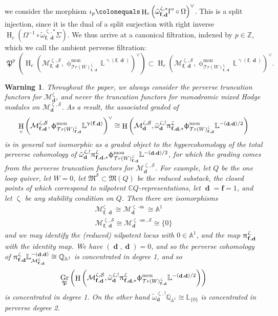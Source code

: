 \documentclass[a4paper,10pt]{amsart}
\renewcommand{\gamma}{\upgamma}
\renewcommand{\zeta}{\upzeta}
\renewcommand{\pi}{\uppi\hspace{0.05em}}
\renewcommand{\Gamma}{\Upgamma}
\renewcommand{\phi}{\upphi}
\newtheorem{warning}[theorem]{Warning}
\renewcommand{\AA}{\mathbb{A}}
\DeclareMathOperator{\Pf}{\mathfrak{P}}
\newcommand{\ff}{\mathbf{f}}
\newcommand{\LL}{\mathbb{L}}
\newcommand{\QQ}{\mathbb{Q}}
\newcommand{\SP}{\mathcal{S}}
\newcommand{\WW}{\mathcal{T}r(W)}
\newcommand{\Mst}{\mathfrak{M}}
\newcommand{\Msp}{\mathcal{M}}
\newcommand{\phim}[1]{\phi^{\mon}_{#1}}
\DeclareMathOperator{\sst}{-ss}
\DeclareMathOperator{\mon}{mon}
\DeclareMathOperator{\Gr}{Gr}
\DeclareMathOperator{\dd}{\mathbf{d}}
\DeclareMathOperator{\HO}{H}
\begin{document}
we consider the morphism $\iota_p\colonequals\HO_c\left(\tilde{\omega}_{\ff,\dd}^{\zeta,*}\Gamma'\circ \Omega\right)^{\vee}$.  This is a split injection, since it is the dual of a split surjection with right inverse $\HO_c(\Omega^{-1}\circ\tilde{\omega}_{\ff,\dd}^{\zeta,*}\Sigma)$.  We thus arrive at a canonical filtration, indexed by $p\in\mathbb{Z}$, which we call the ambient perverse filtration:
\[
\Pf^p\left(\HO_c\left(\Msp^{\zeta,\SP}_{\ff,\dd},\phim{\WW^{\zeta}_{\ff,\dd}}\LL^{\gamma(\ff,\dd)}\right)^{\vee}\right)\subset \HO_c\left(\Msp^{\zeta,\SP}_{\ff,\dd},\phim{\WW_{\ff,\dd}^{\zeta}}\LL^{\gamma(\ff,\dd)}\right)^{\vee}.
\]
\begin{warning}
\label{PervWarning}
Throughout the paper, we always consider the perverse truncation functors for $\Msp_{\dd}^{\zeta}$, and never the truncation functors for monodromic mixed Hodge modules on $\Msp_{\dd}^{\zeta,\SP}$.  As a result, the associated graded of 
\[
\HO_c\left(\Msp^{\zeta,\SP}_{\ff,\dd},\phim{\WW_{\ff,\dd}^{\zeta}}\LL^{\gamma(\ff,\dd)}\right)^{\vee}\cong \HO\left(\Msp^{\zeta,\SP}_{\dd},\tilde{\omega}^{\zeta,!}_{\dd}\pi_{\ff,\dd,*}^{\zeta}\phim{\WW^{\zeta}_{\ff,\dd}}\LL^{{}-(\dd,\dd)/2}\right)
\]
is in general \textit{not} isomorphic as a graded object to the hypercohomology of the total perverse cohomology of $\tilde{\omega}^{\zeta,!}_{\dd}\pi_{\ff,\dd,*}^{\zeta}\phim{\WW^{\zeta}_{\ff,\dd}}\LL^{{}-(\dd,\dd)/2}$, for which the grading comes from the perverse truncation functors for $\Msp_{\dd}^{\zeta,\SP}$.  For example, let $Q$ be the one loop quiver, let $W=0$, let $\Mst^{\SP}\subset \Mst(Q)$ be the reduced substack, the closed points of which correspond to nilpotent $\mathbb{C}Q$-representations, let $\dd=\ff=1$, and let $\zeta$ be any stability condition on $Q$.   Then there are isomorphisms
\begin{align*}
\Msp^{\zeta}_{\ff,\dd}\cong\Msp^{\zeta\sst}_{\dd}\cong\mathbb{A}^1\\
\Msp^{\zeta,\SP}_{\ff,\dd}\cong\Msp^{\zeta\sst,\SP}_{\dd}\cong \{0\}
\end{align*}
and we may identify the (reduced) nilpotent locus with $0\in\AA^1$, and the map $\pi^{\zeta}_{\ff,\dd}$ with the identity map.  We have $(\dd,\dd)=0$, and so the perverse cohomology of $\pi^{\zeta}_{\ff,\dd}\LL_{\Msp_{\ff,\dd}^{\zeta}}^{-(\dd,\dd)}\cong\QQ_{\AA^1}$ is concentrated in degree 1, and so
\[
\Gr_{\Pf}\left(\HO\left(\Msp^{\zeta,\SP}_{\ff,\dd},\tilde{\omega}^{\zeta,!}_{\dd}\pi_{\ff,\dd,*}^{\zeta}\phim{\WW^{\zeta}_{\ff,\dd}}\LL^{{}-(\dd,\dd)/2}\right)\right)
\]
is concentrated in degree 1.  On the other hand $\tilde{\omega}^{\zeta,!}_{\dd}\mathbb{Q}_{\AA^1}\cong \LL_{\{0\}}$ is concentrated in perverse degree 2.


\end{warning}
\end{document}
